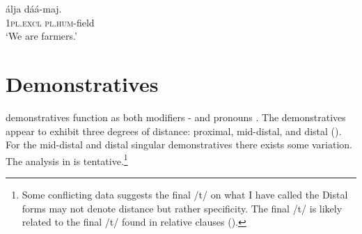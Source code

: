 \documentclass[output=paper]{langsci/langscibook}
\begin{document}
\ex\label{ex:ahlandc:55b}
\gll
álja             dáá-maj. \\
  1\textsc{pl.excl}   \textsc{pl.hum}{}-field\\
  \glt
  ‘We are farmers.’
\z 
\z


\begin{table}
\caption{Pronominal NN constructions with derived nouns}
\label{tab:ahlandc:10}
\end{table}

\section{Demonstratives}\label{sec:ahlandc:9}

 demonstratives function as both modifiers - and pronouns . The demonstratives appear to exhibit three degrees of distance: proximal, mid-distal, and distal (). For the mid-distal and distal singular demonstratives there exists some variation. The analysis in  is tentative.\footnote{Some conflicting data suggests the final /t/ on what I have called the Distal forms may not denote distance but rather specificity. The final /t/ is likely related to the final /t/ found in relative clauses ().}
\end{document}
